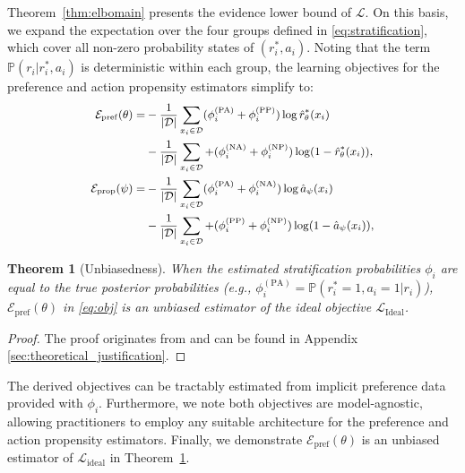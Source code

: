 \documentclass[]{arxiv_singlecolumn}
\theoremstyle{plain}
\newtheorem{theorem}{Theorem}[section]
\theoremstyle{definition}
\theoremstyle{remark}
\begin{document}
Theorem~\ref{thm:elbomain} presents the evidence lower bound of $\mathcal{L}$. On this basis, we expand the expectation over the four groups defined in \eqref{eq:stratification}, which cover all non-zero probability states of $(r^*_i,a_i)$.  Noting that the term $\mathbb{P}(r_i|r^*_i,a_i)$ is deterministic within each group, the learning objectives for the preference and action propensity estimators simplify to:
\begin{equation}\small
    \begin{aligned}\label{eq:obj}
        \mathcal{E}_\mathrm{pref}(\theta)=&-\frac{1}{|\mathcal{D}|} \sum_{x_i\in\mathcal{D}} (\phi^\mathrm{(PA)}_i+\phi^\mathrm{(PP)}_i)\log\hat{r}^*_\theta(x_i)\\
        &-\frac{1}{|\mathcal{D}|} \sum_{x_i\in\mathcal{D}}+(\phi^\mathrm{(NA)}_i+\phi^\mathrm{(NP)}_i)\log(1-\hat{r}^*_\theta(x_i)),\\
        \mathcal{E}_\mathrm{prop}(\psi)=&-\frac{1}{|\mathcal{D}|} \sum_{x_i\in\mathcal{D}} (\phi^\mathrm{(PA)}_i+\phi^\mathrm{(NA)}_i)\log\hat{a}_\psi(x_i)\\
        &-\frac{1}{|\mathcal{D}|} \sum_{x_i\in\mathcal{D}}+(\phi^\mathrm{(PP)}_i+\phi^\mathrm{(NP)}_i)\log(1-\hat{a}_\psi(x_i)),\\
    \end{aligned}
\end{equation}

\begin{theorem}[Unbiasedness]\label{thm:unbiasednessmain}
    When the estimated stratification probabilities $\phi_i$ are equal to the true posterior probabilities (e.g., $\phi^\mathrm{(PA)}_i = \mathbb{P}(r^*_i=1, a_i=1|r_i)$), $\mathcal{E}_\mathrm{pref}(\theta)$ in \eqref{eq:obj} is an unbiased estimator of the ideal objective $\mathcal{L}_\mathrm{Ideal}$.
\end{theorem}
\begin{proof}
    The proof originates from \citep{Recrec} and can be found in Appendix \ref{sec:theoretical_justification}.
\end{proof}

The derived objectives can be tractably estimated from implicit preference data provided with $\phi_i$. Furthermore, we note both objectives are model-agnostic, allowing practitioners to employ any suitable architecture for the preference and action propensity estimators. Finally, we demonstrate $\mathcal{E}_\mathrm{pref}(\theta)$ is an unbiased estimator of $\mathcal{L}_\mathrm{ideal}$ in Theorem~\ref{thm:unbiasednessmain}.
\end{document}
